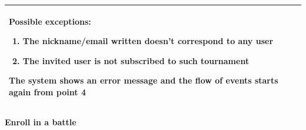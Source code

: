 \documentclass[../RASD.tex]{subfiles}
\begin{document}
\begin{table}[h!]
\begin{center}
\begin{tabular}{|m{10em}|m{30em}|}
                    Possible exceptions:
                    \begin{enumerate}
                        \item The nickname/email written doesn't correspond to any user
                        \item The invited user is not subscribed to such tournament
                    \end{enumerate}
                    The system shows an error message and the flow of events starts again from point 4\\
                \hline
                \end{tabular}
            \end{center}
        \end{table}\newpage

        \textbf{Enroll in a battle}
\end{document}
